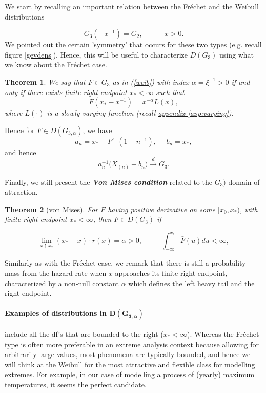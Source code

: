 \documentclass[11pt,a4paper,openany ]{book}
\newtheorem{theorem}{Theorem}[chapter]
\begin{document}
We start by recalling an important relation between the Fréchet and the Weibull distributions 

\begin{equation*}
G_3(-x^{-1})=G_2, \qquad\quad x>0.
\end{equation*}
We pointed out the certain 'symmetry' that occurs for these two types (e.g. recall figure \ref{gevdens}). Hence, this will be useful to characterize $D(G_3)$ using what we know about the Fréchet case.

\begin{theorem}
We say that $F\in G_{3}$ as in (\ref{weib}) with index $\alpha=\xi^{-1}>0$ if and only if there exists finite right endpoint $x_*<\infty$ such that 
\begin{equation}
\bar{F}(x_*-x^{-1})=x^{-\alpha}L(x),
\end{equation}
where $L(\cdot)$ is a slowly varying function (recall \hyperref[app:varying]{appendix \ref{app:varying}}).
\end{theorem}
Hence for $F\in D(G_{3,\alpha})$, we have 
\begin{equation*}
a_n=x_*-F^{\leftarrow}(1-n^{-1}), \ \  \ \ \ \ b_n=x_*,
\end{equation*}
and hence
\begin{equation*}
a^{-1}_n\Big(X_{(n)}-b_n\Big)\stackrel{d}{\rightarrow}G_{3}.
\end{equation*}

Finally, we still present the \emph{\textbf{Von Mises condition}} related to the $G_{3})$ domain of attraction. 

\begin{theorem}[von Mises] For $F$ having positive derivative on some $[x_0,x_*)$, with finite right endpoint $x_*<\infty$, then $F\in D(G_{3})$ if

\begin{equation}
\displaystyle{\lim_{ x  \uparrow  x_*}}(x_*-x)\cdot r(x)=\alpha >0, \ \ \ \ \ \ \ \ \ \     \ \
\int^{x_*}_{-\infty} \bar{F}(u)du<\infty,
\end{equation}
\end{theorem}
Similarly as with the Fréchet case, we remark that there is still a probability mass from the hazard rate when $x$ approaches its finite right endpoint, characterized by a non-null constant $\alpha$ which defines the left heavy tail and the right endpoint.

\paragraph*{Examples of distributions in $\boldsymbol{D(G_{3,\alpha})}$} include all the df's that are bounded to the right ($x_*<\infty$). Whereas the Fréchet type is often more preferable in an extreme analysis context because allowing for arbitrarily large values, most phenomena are typically bounded, and hence we will think at the Weibull for the most attractive and flexible class for modelling extremes. For example, in our case of modelling a process of (yearly) maximum temperatures, it seems the perfect candidate.
\end{document}
